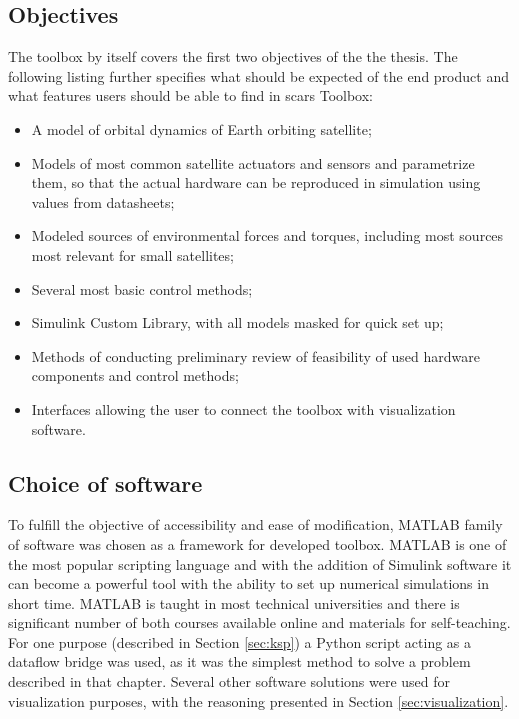 \subsection{Objectives}\label{toolbox:objectives}
    The toolbox by itself covers the first two objectives of the the thesis. The following listing further specifies what should be expected of the end product and what features users should be able to find in \ac{scars} Toolbox: 
    \begin{itemize}
        \item A model of orbital dynamics of Earth orbiting satellite;
        \item Models of most common satellite actuators and sensors and parametrize them, so that the actual hardware can be reproduced in simulation using values from datasheets;
        \item Modeled sources of environmental forces and torques, including most sources most relevant for small satellites;
        \item Several most basic control methods;
        \item Simulink Custom Library, with all models masked for quick set up;
        \item Methods of conducting preliminary review of feasibility of used hardware components and control methods;
        \item Interfaces allowing the user to connect the toolbox with visualization software.
    \end{itemize}

\subsection{Choice of software}\label{toolbox:software}
    To fulfill the objective of accessibility and ease of modification, MATLAB family of software was chosen as a framework for developed toolbox. MATLAB is one of the most popular scripting language and with the addition of Simulink software it can become a powerful tool with the ability to set up numerical simulations in short time. MATLAB is taught in most technical universities and there is significant number of both courses available online and materials for self-teaching. For one purpose (described in Section \ref{sec:ksp}) a Python script acting as a dataflow bridge was used, as it was the simplest method to solve a problem described in that chapter. Several other software solutions were used for visualization purposes, with the reasoning presented in Section \ref{sec:visualization}.

